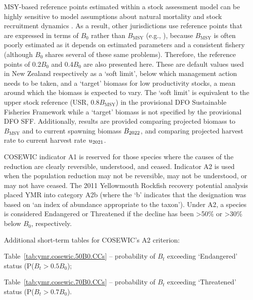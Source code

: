 \documentclass[11pt]{book}
\newcommand{\Bmsy}{B_\text{MSY}}
\newcommand{\pc}{\%}
\begin{document}
MSY-based reference points estimated within a stock assessment model can be highly sensitive to model assumptions about natural mortality and stock recruitment dynamics \citep{Forrest-etal:2018}.
As a result, other jurisdictions use reference points that are expressed in terms of $B_0$ rather than $\Bmsy$ (e.g., \citealt{NZMF:2011}), because $\Bmsy$ is often poorly estimated as it depends on estimated parameters and a consistent fishery (although $B_0$ shares several of these same problems).
Therefore, the reference points of 0.2$B_0$ and 0.4$B_0$ are also presented here.
These are default values used in New Zealand respectively as a `soft limit', below which management action needs to be taken, and a `target' biomass for low productivity stocks, a mean around which the biomass is expected to vary.
The `soft limit' is equivalent to the upper stock reference (USR, 0.8$\Bmsy$) in the provisional DFO Sustainable Fisheries Framework while a `target' biomass is not specified by the provisional DFO SFF.
Additionally, results are provided comparing projected biomass to $\Bmsy$ and to current spawning biomass $B_{2022}$, and comparing projected harvest rate to current harvest rate $u_{2021}$.

COSEWIC indicator A1 is reserved for those species where the causes of the reduction are clearly reversible, understood, and ceased.
Indicator A2 is used when the population reduction may not be reversible, may not be understood, or may not have ceased.
The 2011 Yellowmouth Rockfish recovery potential analysis \citep{Edwards-etal:2012_ymr} placed YMR into category A2b (where the `b' indicates that the designation was based on `an index of abundance appropriate to the taxon').
Under A2, a species is considered Endangered or Threatened if the decline has been >50\pc{} or >30\pc{} below $B_0$, respectively.

Additional short-term tables for COSEWIC's A2 criterion:
\begin{itemize_csas}{}{}
\item Table~\ref{tab:ymr.cosewic.50B0.CCs}  -- probability of $B_t$ exceeding `Endangered' status (P($B_t > 0.5B_0$);
\item Table~\ref{tab:ymr.cosewic.70B0.CCs}  -- probability of $B_t$ exceeding `Threatened' status (P($B_t > 0.7B_0$).
\end{itemize_csas}
\end{document}
